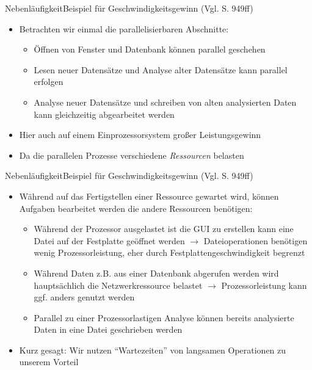 \begin{frame}{Nebenläufigkeit}{Beispiel für Geschwindigkeitsgewinn (Vgl. \cite{ullenboom2018java} S. 949ff)}
    \begin{itemize}
        \item Betrachten wir einmal die parallelisierbaren Abschnitte:
        \begin{itemize}
            \item Öffnen von Fenster und Datenbank können parallel geschehen
            \item Lesen neuer Datensätze und Analyse alter Datensätze kann parallel erfolgen
            \item Analyse neuer Datensätze und schreiben von alten analysierten Daten kann gleichzeitig abgearbeitet werden
        \end{itemize}
        \item Hier auch auf einem Einprozessorsystem großer Leistungsgewinn
        \item Da die parallelen Prozesse verschiedene \textit{Ressourcen} belasten
    \end{itemize}
\end{frame}

\begin{frame}{Nebenläufigkeit}{Beispiel für Geschwindigkeitsgewinn (Vgl. \cite{ullenboom2018java} S. 949ff)}
    \begin{itemize}
        \item Während auf das Fertigstellen einer Ressource gewartet wird, können Aufgaben bearbeitet werden die andere Ressourcen benötigen:
        \begin{itemize}
            \item Während der Prozessor ausgelastet ist die GUI zu erstellen kann eine Datei auf der Festplatte geöffnet werden $\rightarrow$ Dateioperationen benötigen wenig Prozessorleistung, eher durch Festplattengeschwindigkeit begrenzt
            \item Während Daten z.B. aus einer Datenbank abgerufen werden wird hauptsächlich die Netzwerkressource belastet $\rightarrow$ Prozessorleistung kann ggf. anders genutzt werden
            \item Parallel zu einer Prozessorlastigen Analyse können bereits analysierte Daten in eine Datei geschrieben werden
        \end{itemize}
        \item Kurz gesagt: Wir nutzen "`Wartezeiten"' von langsamen Operationen zu unserem Vorteil
    \end{itemize}
\end{frame}

